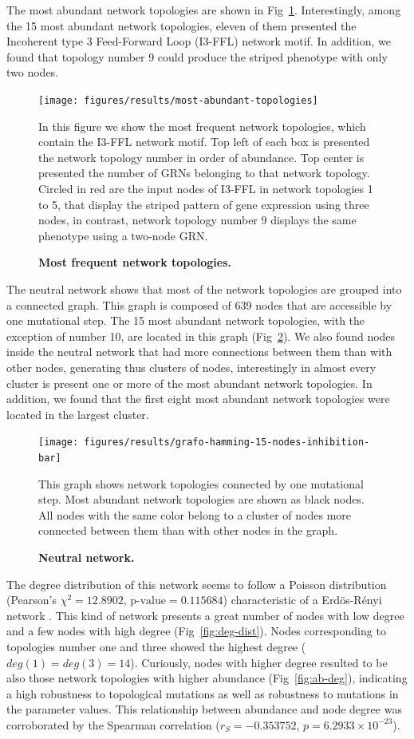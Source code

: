 \documentclass[10pt,letterpaper]{article}
\begin{document}
The most abundant network topologies are shown in Fig~\ref{fig:topol}. 
Interestingly, among the 15 most abundant network topologies, eleven of them 
presented the Incoherent type 3 Feed-Forward Loop (I3-FFL) network motif. In 
addition, we found that topology number 9 could produce the striped phenotype 
with only two nodes.

\begin{figure}[!h]
 \texttt{[image: figures/results/most-abundant-topologies]}
 \caption{\bf Most frequent network topologies.}
 In this figure we show the most frequent network topologies, which contain the 
 I3-FFL network motif. Top left of each box is presented the network topology 
 number in order of abundance. Top center is presented the number of GRNs 
 belonging to that network topology. Circled in red are the input nodes of 
 I3-FFL in network topologies 1 to 5, that display the striped pattern of gene 
 expression using three nodes, in contrast, network topology number 9 displays 
 the same phenotype using a two-node GRN.
 \label{fig:topol}
\end{figure}

The neutral network shows that most of the network topologies are grouped into a
connected graph. This graph is composed of 639 nodes that are accessible by one 
mutational step. The 15 most abundant network topologies, with the exception of 
number 10, are located in this graph (Fig~\ref{fig:neutral-network}). We also 
found nodes inside the neutral network that had more connections between them 
than with other nodes, generating thus clusters of nodes, interestingly in 
almost every cluster is present one or more of the most abundant network 
topologies. In addition, we found that the first eight most abundant network 
topologies were located in the largest cluster.

\begin{figure}[!h]
 \texttt{[image: figures/results/grafo-hamming-15-nodes-inhibition-bar]}
 \caption{\bf Neutral network.}
 This graph shows network topologies connected by one mutational step. Most 
 abundant network topologies are shown as black nodes. All nodes with the same 
 color belong to a cluster of nodes more connected between them than with other 
 nodes in the graph.
 \label{fig:neutral-network}
\end{figure}

The degree distribution of this network seems to follow a Poisson distribution
(Pearson’s $\chi^2 = 12.8902$, $\text{p-value} = 0.115684$) characteristic of a 
Erdös-Rényi network \cite{Erdos1959}. This kind of network presents a great 
number of nodes with low degree and a few nodes with high degree 
(Fig~\ref{fig:deg-dist}). Nodes corresponding to topologies number one and three
showed the highest degree ($deg(1) = deg (3) = 14$). Curiously, nodes with 
higher degree resulted to be also those network topologies with higher abundance
(Fig~\ref{fig:ab-deg}), indicating a high robustness to topological mutations as
well as robustness to mutations in the parameter values. This relationship 
between abundance and node degree was corroborated by the Spearman correlation 
($r_S = −0.353752$, $p = 6.2933\times10^{-23} $).
\end{document}
